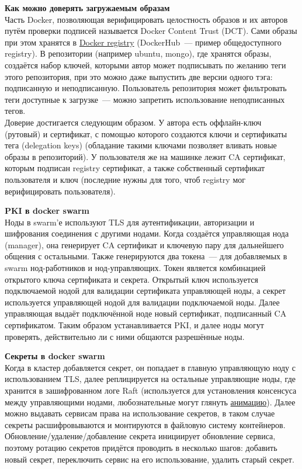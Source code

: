     \textbf{Как можно доверять загружаемым образам} ~\\
    Часть Docker, позволяющая верифицировать целостность образов и их авторов путём проверки подписей называется Docker Content Trust (DCT). Сами образы при этом хранятся в \href{https://docs.docker.com/registry/}{Docker registry} (DockerHub~--- пример общедоступного registry).
    В репозитории (например ubuntu, mongo), где хранятся образы, создаётся набор ключей, которыми автор может подписывать по желанию теги этого репозитория, при это можно даже выпустить две версии одного тэга:
    подписанную и неподписанную. Пользователь репозитория может фильтровать теги доступные к загрузке~--- можно запретить использование неподписанных тегов. ~\\
    Доверие достигается следующим образом. У автора есть оффлайн-ключ (рутовый) и сертификат, с помощью которого создаются ключи и сертификаты тега (delegation keys) (обладание такими ключами позволяет вливать новые образы в репозиторий). \autocite{DockerSecurityTrust} У пользователя же на машинке лежит
    CA сертификат, которым подписан registry сертификат, а также собственный сертификат пользователя и ключ (последние нужны для того, чтоб registry мог верифицировать пользователя). \autocite{DockerSecurityCertificates}

    \textbf{PKI в docker swarm} ~\\
    Ноды в swarm'е используют TLS для аутентификации, авторизации и шифрования соединения с другими нодами. Когда создаётся управляющая нода (manager), она генерирует CA сертификат и ключевую пару для
    дальнейшего общения с остальными. Также генерируются два токена~--- для добавляемых в swarm нод-работников и нод-управляющих. Токен является комбинацией открытого ключа сертификата и секрета. Открытый ключ используется подключаемой нодой для валидации сертификата управляющей ноды, а секрет
    используется управляющей нодой для валидации подключаемой ноды. Далее управляющая выдаёт подключённой ноде новый сертификат, подписанный CA сертификатом. Таким образом устанавливается PKI, и далее ноды могут проверять, действительно ли с ними общаются разрешённые ноды. \autocite{DockerSwarmPKI}

    \textbf{Секреты в docker swarm} ~\\
    Когда в кластер добавляется секрет, он попадает в главную управляющую ноду с использованием TLS, далее реплицируется на остальные управляющие ноды, где хранится в зашифрованном логе Raft (используется для установления консенсуса между управляющими нодами, любознательные могут
    глянуть \href{http://thesecretlivesofdata.com/raft/}{анимацию}). Далее можно выдавать сервисам права на использование секретов, в таком случае секреты расшифровываются и монтируются в файловую систему контейнеров. Обновление/удаление/добавление секрета инициирует обновление сервиса,
    поэтому ротацию секретов придётся проводить в несколько шагов: добавить новый секрет, переключить сервис на его использование, удалить старый секрет. \autocite{DockerSwarmSecrets}

